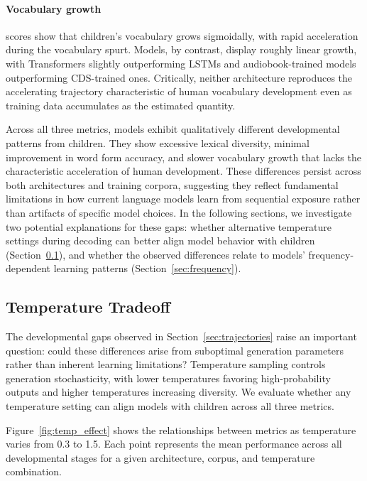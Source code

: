 \paragraph{Vocabulary growth} \meCDI{} scores show that children's vocabulary grows sigmoidally, with rapid acceleration during the vocabulary spurt. Models, by contrast, display roughly linear growth, with Transformers slightly outperforming LSTMs and audiobook-trained models outperforming CDS-trained ones. Critically, neither architecture reproduces the accelerating trajectory characteristic of human vocabulary development even as training data accumulates as the estimated quantity.

Across all three metrics, models exhibit qualitatively different developmental patterns from children. They show excessive lexical diversity, minimal improvement in word form accuracy, and slower vocabulary growth that lacks the characteristic acceleration of human development. These differences persist across both architectures and training corpora, suggesting they reflect fundamental limitations in how current language models learn from sequential exposure rather than artifacts of specific model choices. In the following sections, we investigate two potential explanations for these gaps: whether alternative temperature settings during decoding can better align model behavior with children (Section~\ref{sec:temperature}), and whether the observed differences relate to models' frequency-dependent learning patterns (Section~\ref{sec:frequency}).


\subsection{Temperature Tradeoff} 
\label{sec:temperature}

The developmental gaps observed in Section~\ref{sec:trajectories} raise an important question: could these differences arise from suboptimal generation parameters rather than inherent learning limitations? Temperature sampling controls generation stochasticity, with lower temperatures favoring high-probability outputs and higher temperatures increasing diversity. We evaluate whether any temperature setting can align models with children across all three metrics.

Figure~\ref{fig:temp_effect} shows the relationships between metrics as temperature varies from 0.3 to 1.5. Each point represents the mean performance across all developmental stages for a given architecture, corpus, and temperature combination.

